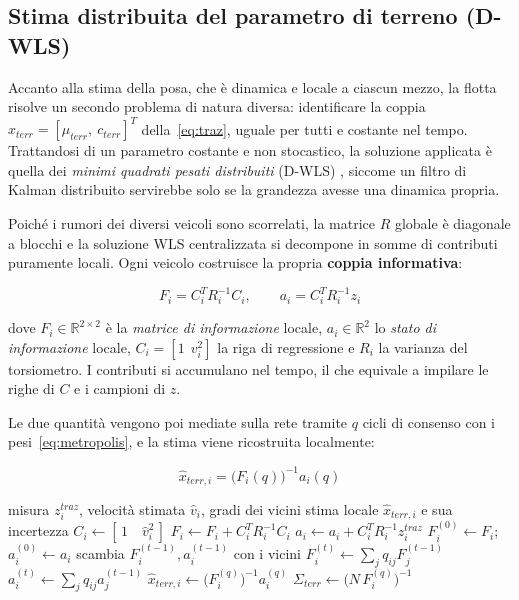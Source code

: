 \documentclass[conference,9pt]{IEEEtran}
\begin{document}
\subsection{Stima distribuita del parametro di terreno (D-WLS)}
\label{sub:dwls}

Accanto alla stima della posa, che \`e dinamica e locale a ciascun mezzo, la
flotta risolve un secondo problema di natura diversa: identificare la coppia
$x_{terr} = [\mu_{terr},\ c_{terr}]^T$ della~\eqref{eq:traz}, uguale per tutti
e costante nel tempo. Trattandosi di un parametro costante e non stocastico, la
soluzione applicata \`e quella dei \emph{minimi quadrati pesati distribuiti}
(D-WLS) \cite{fontanelli_notes}, siccome un filtro di Kalman distribuito
servirebbe solo se la grandezza avesse una dinamica propria.

Poich\'e i rumori dei diversi veicoli sono scorrelati, la matrice $R$ globale
\`e diagonale a blocchi e la soluzione WLS centralizzata si decompone in somme
di contributi puramente locali. Ogni veicolo costruisce la propria
\textbf{coppia informativa}:

\begin{equation}
F_i = C_i^T R_i^{-1} C_i, \qquad a_i = C_i^T R_i^{-1} z_i
\label{eq:coppia}
\end{equation}

dove $F_i \in \mathbb{R}^{2\times2}$ \`e la \emph{matrice di informazione}
locale, $a_i \in \mathbb{R}^2$ lo \emph{stato di informazione} locale,
$C_i = [1\ \ v_i^2]$ la riga di regressione e $R_i$ la varianza del torsiometro.
I contributi si accumulano nel tempo, il che equivale a impilare le righe di
$C$ e i campioni di $z$.

Le due quantit\`a vengono poi mediate sulla rete tramite $q$ cicli di consenso
con i pesi~\eqref{eq:metropolis}, e la stima viene ricostruita localmente:

\begin{equation}
\hat x_{terr,i} = \big(F_i(q)\big)^{-1} a_i(q)
\label{eq:ricostruzione}
\end{equation}

\begin{algorithm}[t]
\caption{D-WLS eseguito dal veicolo $i$ a ogni passo}
\label{alg:dwls}
\begin{algorithmic}[1]
\Require misura $z^{traz}_i$, velocit\`a stimata $\hat v_i$, gradi dei vicini
\Ensure stima locale $\hat x_{terr,i}$ e sua incertezza
\State $C_i \gets [\,1 \quad \hat v_i^2\,]$
\State $F_i \gets F_i + C_i^T R_i^{-1} C_i$
\State $a_i \gets a_i + C_i^T R_i^{-1} z^{traz}_i$
\State $F_i^{(0)} \gets F_i$; \quad $a_i^{(0)} \gets a_i$
  \State scambia $F_i^{(t-1)}, a_i^{(t-1)}$ con i vicini
  \State $F_i^{(t)} \gets \sum_j q_{ij} F_j^{(t-1)}$
  \State $a_i^{(t)} \gets \sum_j q_{ij} a_j^{(t-1)}$
\EndFor
\State $\hat x_{terr,i} \gets \big(F_i^{(q)}\big)^{-1} a_i^{(q)}$
\State $\Sigma_{terr} \gets \big(N\,F_i^{(q)}\big)^{-1}$
\end{algorithmic}
\end{algorithm}
\end{document}
